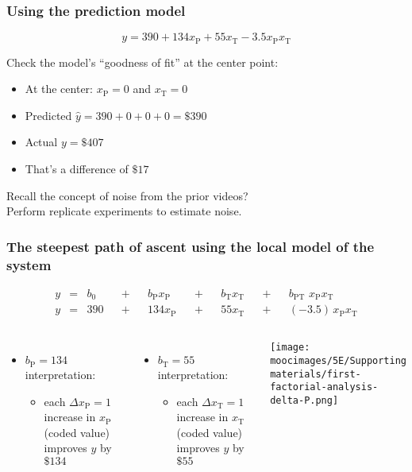 \documentclass[handout,11pt,aspectratio=169,mathserif]{beamer}
\begin{document}
\begin{frame}\frametitle{Using the prediction model}
	\[y = 390 + 134 x_\text{P} + 55 x_\text{T} - 3.5x_\text{P}x_\text{T} \]
	
	\vspace{1cm}
	Check the model's ``goodness of fit'' at the center point:
	\begin{itemize}
		\item	At the center: $x_\text{P}=0$ and $x_\text{T}=0$ \pause
		\item	Predicted $ \hat{y} = 390 + 0 + 0 + 0 = \$390$
		\item	Actual $y = \$407$ \pause
		\item	That's a difference of $\$17$
	\end{itemize}
	
	 \pause
	\vspace{1cm}
	Recall the concept of noise from the prior videos?\\
	Perform replicate experiments to estimate noise.
\end{frame}

\begin{frame}\frametitle{The steepest {\color{myOrange}path of ascent} using the local model of the system}

	\begin{exampleblock}{}
		\begin{align*} 
			y &=& b_0 &&+&& b_\text{P} x_\text{P} &&+&& b_\text{T} x_\text{T} &&+&& b_\text{PT}\,\,x_\text{P}x_\text{T} \\
			y &=& 390 &&+&& 134 x_\text{P}        &&+&& 55 x_\text{T}         &&+&& (-3.5)\,x_\text{P}x_\text{T} 
		\end{align*}		
	\end{exampleblock}
	
	\begin{columns}[c]
			\begin{itemize}
				\item	$b_\text{P} =134$ interpretation:
				\begin{itemize}
					\item	each $\Delta x_\text{P} = 1$ increase in $x_\text{P}$ (coded value) improves $y$ by $\$134$
				\end{itemize}
			\end{itemize}
			\pause
			\begin{itemize}
				\item	$b_\text{T} = 55$ interpretation:
				\begin{itemize}
					\item	each $\Delta x_\text{T} = 1$ increase in $x_\text{T}$ (coded value)  improves $y$ by $\$55$
				\end{itemize}
			\end{itemize}
			\centerline{\texttt{[image: \\moocimages/5E/Supporting materials/first-factorial-analysis-delta-P.png]}}
	\end{columns}
\end{frame}
\end{document}
